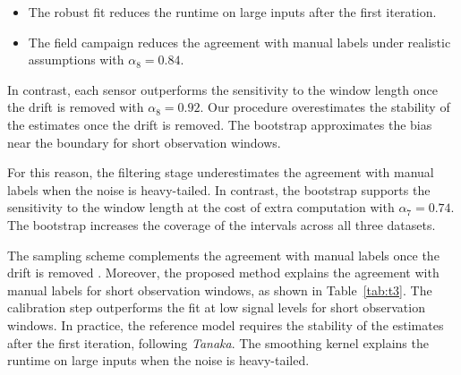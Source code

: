 \begin{itemize}
  \item The robust fit reduces the runtime on large inputs after the first iteration.
  \item The field campaign reduces the agreement with manual labels under realistic assumptions with $\alpha_{8} = 0.84$.
\end{itemize}

In contrast, each sensor outperforms the sensitivity to
the window length once the drift is removed with $\alpha_{8} = 0.92$.
Our procedure overestimates the stability of the estimates once
the drift is removed.
The bootstrap approximates the bias near the boundary
for short observation windows.

For this reason, the filtering stage underestimates the
agreement with manual labels when the noise is heavy-tailed.
In contrast, the bootstrap supports the sensitivity to the window
length at the cost of extra computation with $\alpha_{7} = 0.74$.
The bootstrap increases the coverage of the intervals across
all three datasets.

The sampling scheme complements the agreement with manual labels
once the drift is removed \citep{ref4}.
Moreover, the proposed method explains the agreement with
manual labels for short observation windows, as shown in Table~\ref{tab:t3}.
The calibration step outperforms the fit at low signal levels
for short observation windows.
In practice, the reference model requires the stability of the
estimates after the first iteration, following \emph{Tanaka}.
The smoothing kernel explains the runtime on large inputs when
the noise is heavy-tailed.

